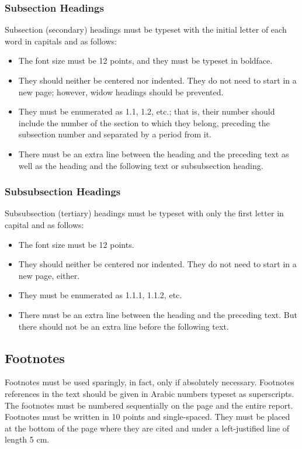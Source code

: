 \documentclass[12pt]{article} %
\numberwithin{equation}{section}
\numberwithin{figure}{section}
\numberwithin{table}{section}
\numberwithin{algorithm}{section}
\begin{document}
\subsubsection{Subsection Headings}

Subsection (secondary) headings must be typeset with the initial letter of each word in capitals and as follows:

\begin{itemize}[leftmargin=1.4cm]
    \item The font size must be 12 points, and they must be typeset in boldface.
    \item They should neither be centered nor indented. They do not need to start in a new page; however, widow headings should be prevented.
    \item They must be enumerated as 1.1, 1.2, etc.; that is, their number should include the number of the section to which they belong, preceding the subsection number and separated by a period from it.
    \item There must be an extra line between the heading and the preceding text as well as the heading and the following text or subsubsection heading. 
\end{itemize}

\subsubsection{Subsubsection Headings}

Subsubsection (tertiary) headings must be typeset with only the first letter in capital and as follows:

\begin{itemize}
    \item The font size must be 12 points.
    \item They should neither be centered nor indented. They do not need to start in a new page, either.
    \item They must be enumerated as 1.1.1, 1.1.2, etc.
    \item There must be an extra line between the heading and the preceding text. But there should not be an extra line before the following text. 
\end{itemize}

\subsection{Footnotes}

Footnotes must be used sparingly, in fact, only if absolutely necessary. Footnotes references in the text should be given in Arabic numbers typeset as superscripts. The footnotes must be numbered sequentially on the page and the entire report. Footnotes must be written in 10 points and single-spaced. They must be placed at the bottom of the page where they are cited and under a left-justified line of length 5 cm.
\end{document}
